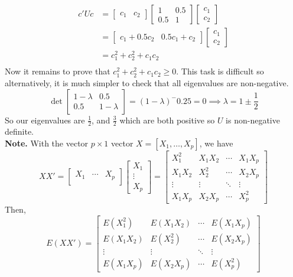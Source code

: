 \documentclass[openany]{report}
\begin{document}
\begin{align*}
    c'Uc &= \begin{bmatrix}
        c_1 & c_2
    \end{bmatrix}\begin{bmatrix}
        1 & 0.5 \\
        0.5 & 1
    \end{bmatrix}\begin{bmatrix}
        c_1 \\ c_2
    \end{bmatrix}\\
    &= \begin{bmatrix}
        c_1 + 0.5c_2 & 0.5c_1 + c_2
    \end{bmatrix}\begin{bmatrix}
        c_1 \\ c_2
    \end{bmatrix}\\
    &= c_1^2 + c_2^2 + c_1c_2\\
\end{align*}
Now it remains to prove that $c_1^2 + c_2^2 + c_1c_2 \geq 0$. This task is difficult so alternatively, it is much simpler to check that all eigenvalues are non-negative.
\[\det\begin{bmatrix}
    1 - \lambda & 0.5 \\
    0.5 & 1 - \lambda
\end{bmatrix}= (1-\lambda)^ - 0.25 = 0 \implies \lambda = 1 \pm \frac{1}{2}\]
So our eigenvalues are $\frac{1}{2}$, and $\frac{3}{2}$ which are both positive so $U$ is non-negative definite.\\[2ex]
\textbf{Note.} With the vector $p \times 1$ vector $X = [X_1, \ldots, X_p]$, we have 
\[XX' = \begin{bmatrix}
    X_1 & \cdots & X_p\\
\end{bmatrix}\begin{bmatrix}
    X_1 \\ \vdots \\ X_p
\end{bmatrix} = 
\begin{bmatrix}
    X_1^2 & X_1X_2 & \cdots & X_1X_p\\
    X_1X_2 & X_2^2 & \cdots & X_2X_p\\
    \vdots & \vdots & \ddots & \vdots\\
    X_1X_p & X_2X_p & \cdots & X_p^2
\end{bmatrix}\]
Then, 
\[E(XX') = \begin{bmatrix}
    E(X_1^2) & E(X_1X_2) & \cdots & E(X_1X_p)\\
    E(X_1X_2) & E(X_2^2) & \cdots & E(X_2X_p)\\
    \vdots & \vdots & \ddots & \vdots\\
    E(X_1X_p) & E(X_2X_p) & \cdots & E(X_p^2)
\end{bmatrix}\]
\end{document}
